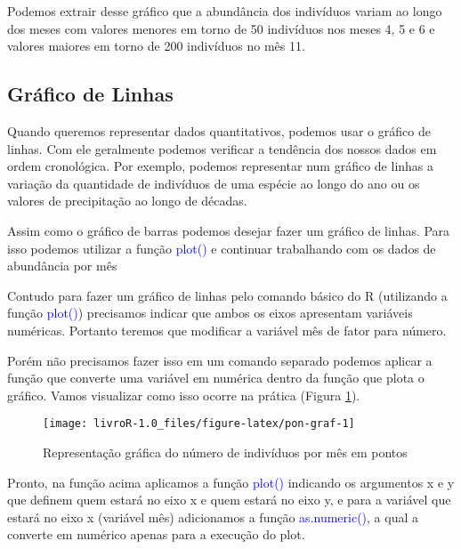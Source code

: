 \documentclass[14pt,titlepage, oneside, openany, a4paper]{book}
\newenvironment{Shaded}{\begin{snugshade}}{\end{snugshade}}
\newcommand{\DataTypeTok}[1]{\textcolor[rgb]{0.13,0.29,0.53}{#1}}
\newcommand{\KeywordTok}[1]{\textcolor[rgb]{0.13,0.29,0.53}{\textbf{#1}}}
\newcommand{\NormalTok}[1]{#1}
\newcommand{\OperatorTok}[1]{\textcolor[rgb]{0.81,0.36,0.00}{\textbf{#1}}}
\begin{document}
Podemos extrair desse gráfico que a abundância dos indivíduos variam ao longo dos meses com valores menores em torno de 50 indivíduos nos meses 4, 5 e 6 e valores maiores em torno de 200 indivíduos no mês 11.

\hypertarget{gruxe1fico-de-linhas}{%
\subsection{Gráfico de Linhas}\label{gruxe1fico-de-linhas}}

Quando queremos representar dados quantitativos, podemos usar o gráfico de linhas. Com ele geralmente podemos verificar a tendência dos nossos dados em ordem cronológica. Por exemplo, podemos representar num gráfico de linhas a variação da quantidade de indivíduos de uma espécie ao longo do ano ou os valores de precipitação ao longo de décadas.

Assim como o gráfico de barras podemos desejar fazer um gráfico de linhas. Para isso podemos utilizar a função \textcolor{blue}{plot()} e continuar trabalhando com os dados de abundância por mês

Contudo para fazer um gráfico de linhas pelo comando básico do R (utilizando a função \textcolor{blue}{plot()}) precisamos indicar que ambos os eixos apresentam variáveis numéricas. Portanto teremos que modificar a variável mês de fator para número.

Porém não precisamos fazer isso em um comando separado podemos aplicar a função que converte uma variável em numérica dentro da função que plota o gráfico. Vamos visualizar como isso ocorre na prática (Figura \ref{fig:pon-graf}).

\begin{Shaded}
\end{Shaded}

\begin{figure}[H]
\texttt{[image: livroR-1.0\_files/figure-latex/pon-graf-1]} \caption{Representação gráfica do número de indivíduos por mês em pontos}\label{fig:pon-graf}
\end{figure}

Pronto, na função acima aplicamos a função \textcolor{blue}{plot()} indicando os argumentos x e y que definem quem estará no eixo x e quem estará no eixo y, e para a variável que estará no eixo x (variável mês) adicionamos a função \textcolor{blue}{as.numeric()}, a qual a converte em numérico apenas para a execução do plot.
\end{document}
